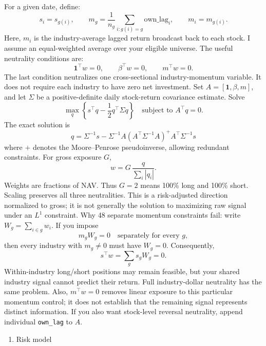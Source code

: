 For a given date, define:
\[ s_i=s_{g(i)},\qquad m_g=\frac{1}{n_g}\sum_{i:g(i)=g}\mathrm{own\_lag}_i, \qquad m_i=m_{g(i)}. \]
Here, \(m_i\) is the industry-average lagged return broadcast back to each stock. I assume an equal-weighted average over your eligible universe.
The useful neutrality conditions are:
\[ \mathbf1^\top w=0,\qquad \beta^\top w=0,\qquad m^\top w=0. \]
The last condition neutralizes one cross-sectional industry-momentum variable. It does not require each industry to have zero net investment.
Set \(A=[\mathbf1,\beta,m]\), and let \(\Sigma\) be a positive-definite daily stock-return covariance estimate. Solve
\[ \max_q\left\{s^\top q-\frac12q^\top\Sigma q\right\} \quad\text{subject to }A^\top q=0. \]
The exact solution is
\[ \boxed{ q=\Sigma^{-1}s- \Sigma^{-1}A \left(A^\top\Sigma^{-1}A\right)^+ A^\top\Sigma^{-1}s } \]
where \(+\) denotes the Moore--Penrose pseudoinverse, allowing redundant constraints.
For gross exposure \(G\),
\[ \boxed{w=G\,\frac{q}{\sum_i|q_i|}}. \]
Weights are fractions of NAV. Thus \(G=2\) means 100\% long and 100\% short. Scaling preserves all three neutralities. This is a risk-adjusted direction normalized to gross; it is not generally the solution to maximizing raw signal under an \(L^1\) constraint.
Why 48 separate momentum constraints fail: write \(W_g=\sum_{i\in g}w_i\). If you impose
\[ m_gW_g=0\quad\text{separately for every }g, \]
then every industry with \(m_g\ne0\) must have \(W_g=0\). Consequently,
\[ s^\top w=\sum_g s_gW_g=0. \]
Within-industry long/short positions may remain feasible, but your shared industry signal cannot predict their return. Full industry-dollar neutrality has the same problem.
Also, \(m^\top w=0\) removes linear exposure to this particular momentum control; it does not establish that the remaining signal represents distinct information. If you also want stock-level reversal neutrality, append individual \texttt{own\_lag} to \(A\).

\begin{enumerate}
\def\labelenumi{\arabic{enumi}.}
\setcounter{enumi}{1}
\tightlist
\item
  Risk model
\end{enumerate}

